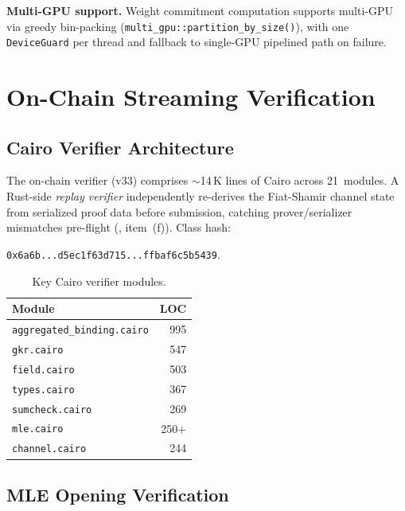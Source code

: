 \documentclass[10pt,twocolumn]{article}
\theoremstyle{definition}
\theoremstyle{remark}
\begin{document}
\textbf{Multi-GPU support.}
Weight commitment computation supports multi-GPU via greedy
bin-packing (\texttt{multi\_gpu::partition\_by\_size()}), with one
\texttt{DeviceGuard} per thread and fallback to single-GPU pipelined
path on failure.


\section{On-Chain Streaming Verification}\label{sec:onchain}

\subsection{Cairo Verifier Architecture}

The on-chain verifier (v33) comprises $\sim$14\,K lines of Cairo across
21~modules.
A Rust-side \emph{replay verifier} independently re-derives the
Fiat-Shamir channel state from serialized proof data before
submission, catching prover/serializer mismatches pre-flight
(, item~(f)).
Class hash:\par
{\small\texttt{0x6a6b...d5ec1f63d715...ffbaf6c5b5439}}.

\begin{table}[t]
  \centering\small
  \caption{Key Cairo verifier modules.}
  \label{tab:cairo}
  \begin{tabular}{@{}lr@{}}
    \toprule
    \textbf{Module} & \textbf{LOC} \\
    \midrule
    \texttt{aggregated\_binding.cairo} & 995 \\
    \texttt{gkr.cairo} & 547 \\
    \texttt{field.cairo} & 503 \\
    \texttt{types.cairo} & 367 \\
    \texttt{sumcheck.cairo} & 269 \\
    \texttt{mle.cairo} & 250+ \\
    \texttt{channel.cairo} & 244 \\
    \bottomrule
  \end{tabular}
\end{table}

\subsection{MLE Opening Verification}
\end{document}
